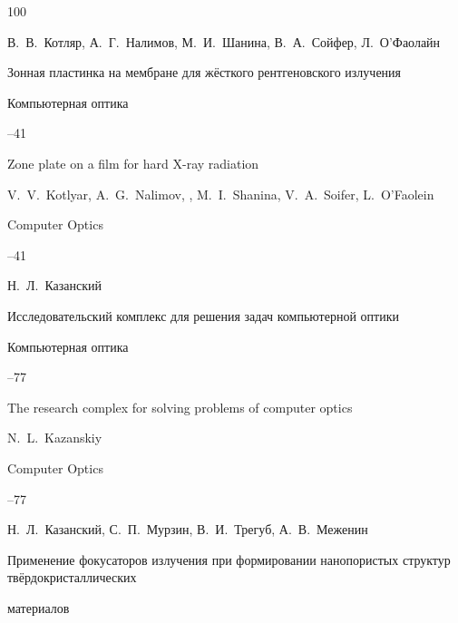 \begin{thebibliography}{100}

\by В.~В.~Котляр, А.~Г.~Налимов, М.~И.~Шанина, В.~А.~Сойфер, Л.~О'Фаолайн

\paper Зонная пластинка на мембране для жёсткого рентгеновского излучения

\jour Компьютерная оптика




--41

\misctransl

\paper Zone plate on a film for hard X-ray radiation

\by V.~V.~Kotlyar, A.~G.~Nalimov, , M.~I.~Shanina, V.~A.~Soifer, L.~O'Faolein

\jour Computer Optics




--41










\by Н.~Л.~Казанский

\paper Исследовательский комплекс для решения задач компьютерной оптики

\jour Компьютерная оптика



--77

\misctransl

\paper The research complex for solving problems of computer optics

\by N.~L.~Kazanskiy

\jour Computer Optics



--77








\by Н.~Л.~Казанский, С.~П.~Мурзин, В.~И.~Трегуб, А.~В.~Меженин

\paper Применение фокусаторов излучения при формировании нанопористых структур твёрдокристаллических

материалов


\end{thebibliography}
